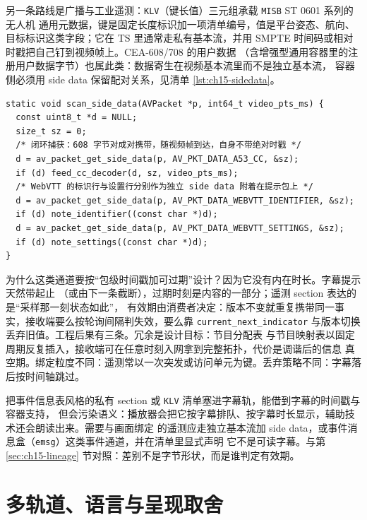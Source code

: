 \documentclass[12pt,a4paper,fontset=fandol]{ctexbook}
\newcommand{\Tp}[1]{\texttt{#1}}
\begin{document}
另一条路线是广播与工业遥测：\Tp{KLV}（键长值）三元组承载 \Tp{MISB} ST 0601 系列的无人机
通用元数据，键是固定长度标识加一项清单编号，值是平台姿态、航向、目标标识这类字段；它在 TS
里通常走私有基本流，并用 SMPTE 时间码或相对时戳把自己钉到视频帧上。CEA-608/708 的用户数据
（含增强型通用容器里的注册用户数据字节）也属此类：数据寄生在视频基本流里而不是独立基本流，
容器侧必须用 side data 保留配对关系，见清单 \ref{lst:ch15-sidedata}。

\begin{lstlisting}[style=cstyle,caption={从视频包与字幕包里取出随附 side data：图文与捕获字幕的配对},label={lst:ch15-sidedata}]
static void scan_side_data(AVPacket *p, int64_t video_pts_ms) {
  const uint8_t *d = NULL;
  size_t sz = 0;
  /* 闭环捕获：608 字节对成对携带，随视频帧到达，自身不带绝对时戳 */
  d = av_packet_get_side_data(p, AV_PKT_DATA_A53_CC, &sz);
  if (d) feed_cc_decoder(d, sz, video_pts_ms);
  /* WebVTT 的标识行与设置行分别作为独立 side data 附着在提示包上 */
  d = av_packet_get_side_data(p, AV_PKT_DATA_WEBVTT_IDENTIFIER, &sz);
  if (d) note_identifier((const char *)d);
  d = av_packet_get_side_data(p, AV_PKT_DATA_WEBVTT_SETTINGS, &sz);
  if (d) note_settings((const char *)d);
}
\end{lstlisting}

为什么这类通道要按``包级时间戳加可过期''设计？因为它没有内在时长。字幕提示天然带起止
（或由下一条截断），过期时刻是内容的一部分；遥测 section 表达的是``采样那一刻状态如此''，
有效期由消费者决定：版本不变就重复携带同一事实，接收端要么按轮询间隔判失效，要么靠
\Tp{current\_next\_indicator} 与版本切换丢弃旧值。工程后果有三条。冗余是设计目标：节目分配表
与节目映射表以固定周期反复插入，接收端可在任意时刻入网拿到完整拓扑，代价是调谐后的信息
真空期。绑定粒度不同：遥测常以一次突发或访问单元为键。丢弃策略不同：字幕落后按时间轴跳过。

\begin{note}[title={图文数据不要伪装成字幕轨}]
把事件信息表风格的私有 section 或 \Tp{KLV} 清单塞进字幕轨，能借到字幕的时间戳与容器支持，
但会污染语义：播放器会把它按字幕排队、按字幕时长显示，辅助技术还会朗读出来。需要与画面绑定
的遥测应走独立基本流加 side data，或事件消息盒（\Tp{emsg}）这类事件通道，并在清单里显式声明
它不是可读字幕。与第 \ref{sec:ch15-lineage} 节对照：差别不是字节形状，而是谁判定有效期。
\end{note}

\section{多轨道、语言与呈现取舍}
\label{sec:ch15-multitrack}
\end{document}
